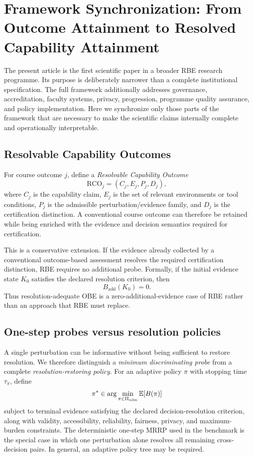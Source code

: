 
\section{Framework Synchronization: From Outcome Attainment to Resolved Capability Attainment}
\label{sec:framework-sync}

The present article is the first scientific paper in a broader RBE research programme. Its purpose is deliberately narrower than a complete institutional specification. The full framework additionally addresses governance, accreditation, faculty systems, privacy, progression, programme quality assurance, and policy implementation. Here we synchronize only those parts of the framework that are necessary to make the scientific claims internally complete and operationally interpretable.

\subsection{Resolvable Capability Outcomes}
For course outcome $j$, define a \emph{Resolvable Capability Outcome}
\[
  \mathrm{RCO}_j=(C_j,E_j,P_j,D_j),
\]
where $C_j$ is the capability claim, $E_j$ is the set of relevant environments or tool conditions, $P_j$ is the admissible perturbation/evidence family, and $D_j$ is the certification distinction. A conventional course outcome can therefore be retained while being enriched with the evidence and decision semantics required for certification.

This is a conservative extension. If the evidence already collected by a conventional outcome-based assessment resolves the required certification distinction, RBE requires no additional probe. Formally, if the initial evidence state $K_0$ satisfies the declared resolution criterion, then
\[
  B_{\mathrm{add}}(K_0)=0.
\]
Thus resolution-adequate OBE is a zero-additional-evidence case of RBE rather than an approach that RBE must replace.

\subsection{One-step probes versus resolution policies}
A single perturbation can be informative without being sufficient to restore resolution. We therefore distinguish a \emph{minimum discriminating probe} from a complete \emph{resolution-restoring policy}. For an adaptive policy $\pi$ with stopping time $\tau_\pi$, define
\[
  \pi^*\in\arg\min_{\pi\in\Pi_{\rm adm}} \mathbb{E}[B(\pi)]
\]
subject to terminal evidence satisfying the declared decision-resolution criterion, along with validity, accessibility, reliability, fairness, privacy, and maximum-burden constraints. The deterministic one-step MRRP used in the benchmark is the special case in which one perturbation alone resolves all remaining cross-decision pairs. In general, an adaptive policy tree may be required.

